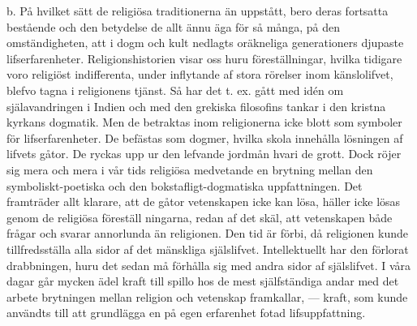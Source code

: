 \documentclass[12pt]{article}
\newcommand{\opage}[1]{\marginnote{\footnotesize\textit{[#1]}}}
\begin{document}
b. På hvilket sätt de religiösa traditionerna än uppstått, bero deras fortsatta bestående och den betydelse de allt ännu äga för så många, på den omständigheten, att i dogm och kult nedlagts oräkneliga generationers djupaste  lifserfarenheter. Religionshistorien visar oss huru föreställningar, hvilka tidigare voro religiöst indifferenta, under inflytande af stora rörelser inom känslolifvet, blefvo tagna i religionens tjänst. Så har det t. ex. gått med idén om själavandringen i Indien och med den grekiska filosofins tankar i den kristna kyrkans dogmatik. Men de betraktas inom religionerna icke blott som symboler för lifserfarenheter. De befästas som dogmer, hvilka skola innehålla lösningen af lifvets gåtor. De ryckas upp ur den lefvande jordmån hvari de grott. Dock röjer sig mera och mera i vår tids religiösa medvetande en brytning mellan den symboliskt-poetiska och den bokstafligt-dogmatiska uppfattningen. Det framträder allt klarare, att de gåtor vetenskapen icke kan lösa, häller icke lösas genom de religiösa föreställ%
\opage{66}
ningarna, redan af det skäl, att vetenskapen både frågar och svarar annorlunda än religionen. Den tid är förbi, då religionen kunde tillfredsställa alla sidor af det mänskliga själslifvet. Intellektuellt har den förlorat drabbningen, huru det sedan må förhålla sig med andra sidor af själslifvet. I våra dagar går mycken ädel kraft till spillo hos de mest själfständiga andar med det arbete brytningen mellan religion och vetenskap framkallar, --- kraft, som kunde användts till att grundlägga en på egen erfarenhet fotad lifsuppfattning.
\end{document}
